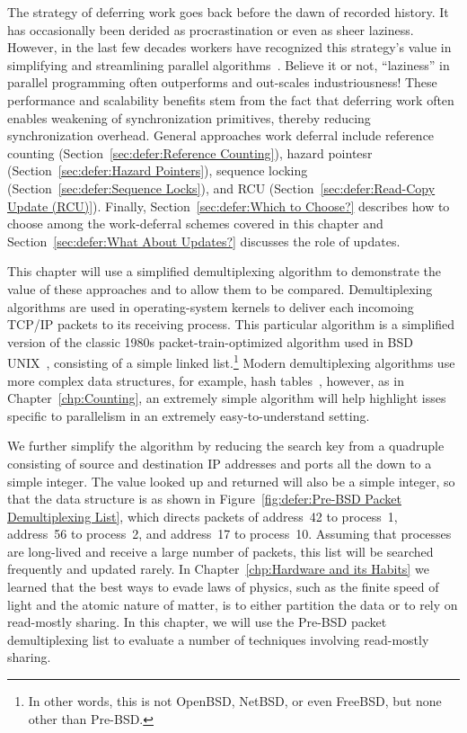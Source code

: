 

The strategy of deferring work goes back before the dawn of recorded
history. It has occasionally been derided as procrastination or
even as sheer laziness.
However, in the last few decades workers have recognized this strategy's value
in simplifying and streamlining parallel algorithms~\cite{Kung80,HMassalinPhD}.
Believe it or not, ``laziness'' in parallel programming often outperforms and
out-scales industriousness!
These performance and scalability benefits stem from the fact that
deferring work often enables weakening of synchronization primitives,
thereby reducing synchronization overhead.
General approaches work deferral include
reference counting (Section~\ref{sec:defer:Reference Counting}),
hazard pointesr (Section~\ref{sec:defer:Hazard Pointers}),
sequence locking (Section~\ref{sec:defer:Sequence Locks}),
and RCU (Section~\ref{sec:defer:Read-Copy Update (RCU)}).
Finally, Section~\ref{sec:defer:Which to Choose?}
describes how to choose among the work-deferral schemes covered in
this chapter and Section~\ref{sec:defer:What About Updates?}
discusses the role of updates.

This chapter will use a simplified demultiplexing algorithm to demonstrate
the value of these approaches and to allow them to be compared.
Demultiplexing algorithms are used in operating-system kernels to
deliver each incomoing TCP/IP packets to its receiving process.
This particular algorithm is a simplified version of the classic 1980s
packet-train-optimized algorithm used in BSD UNIX~\cite{VanJacobson88},
consisting of a simple linked list.\footnote{
	In other words, this is not OpenBSD, NetBSD, or even
	FreeBSD, but none other than Pre-BSD.}
Modern demultiplexing algorithms use more complex data structures,
for example, hash tables~\cite{McKenney92b}, however, as in
Chapter~\ref{chp:Counting}, an extremely simple algorithm will
help highlight isses specific to parallelism in an extremely
easy-to-understand setting.

We further simplify the algorithm by reducing the search key from
a quadruple consisting of source and destination IP addresses and
ports all the down to a simple integer.
The value looked up and returned will also be a simple integer,
so that the data structure is as shown in
Figure~\ref{fig:defer:Pre-BSD Packet Demultiplexing List}, which
directs packets of address~42 to process~1, address~56 to
process~2, and address~17 to process~10.
Assuming that processes are long-lived and receive a large number
of packets, this list will be searched frequently and updated
rarely.
In Chapter~\ref{chp:Hardware and its Habits}
we learned that the best ways to evade laws of physics, such as
the finite speed of light and the atomic nature of matter, is to
either partition the data or to rely on read-mostly sharing.
In this chapter, we will use the Pre-BSD packet demultiplexing
list to evaluate a number of techniques involving read-mostly
sharing.

